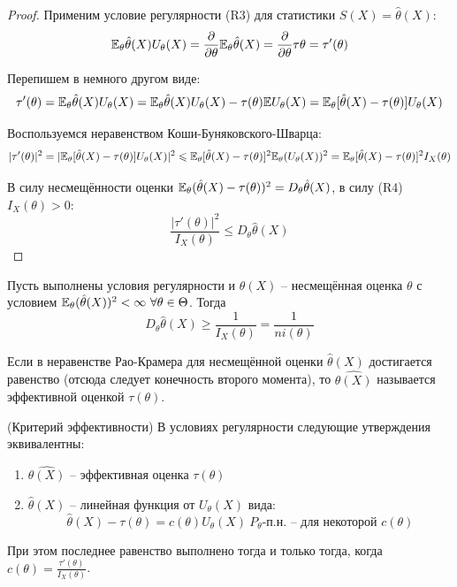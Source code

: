 \begin{proof}
    Применим условие регулярности (R3) для статистики $S(X) = \hat{\theta}(X)$:
    \[
        \mathbb{E}_\theta \hat{\theta}(X) U_\theta(X) = \frac{\partial}{\partial \theta} \mathbb{E}_\theta \hat{\theta}(X) = \frac{\partial}{\partial \theta} \tau{\theta} = \tau'(\theta)
    \]

    Перепишем в немного другом виде:
    \[
        \tau'(\theta) = \mathbb{E}_\theta \hat{\theta}(X) U_\theta(X) = \mathbb{E}_\theta \hat{\theta}(X) U_\theta(X) - \tau(\theta) \mathbb{E} U_\theta(X) = \mathbb{E}_\theta [\hat{\theta}(X) - \tau(\theta)]  U_\theta(X)
    \]

    Воспользуемся неравенством Коши-Буняковского-Шварца:
    \[
        | \tau'(\theta) |^2 = | \mathbb{E}_\theta [\hat{\theta}(X) - \tau(\theta)] U_\theta(X) |^2 \leqslant \mathbb{E}_\theta [\hat{\theta}(X) - \tau(\theta)]^2 \mathbb{E}_\theta (U_\theta(X))^2 = \mathbb{E}_\theta [\hat{\theta}(X) - \tau(\theta)]^2 I_X(\theta)
    \]

    В силу несмещённости оценки $\mathbb{E}_\theta (\hat{\theta}(X) - \tau(\theta))^2 = D_\theta \hat{\theta}(X)$, в силу (R4) $I_X(\theta) > 0$:
    \[
        \frac{|\tau'(\theta)|^2}{I_X(\theta)} \le D_\theta \hat{\theta}(X)
    \]
\end{proof}

\begin{corollary}
    Пусть выполнены условия регулярности и $\hat{\theta}(X)$ -- несмещённая оценка $\theta$ с условием $\mathbb{E}_\theta (\hat{\theta}(X))^2 < \infty \ \forall \theta \in \Theta$. Тогда
    \[
        D_\theta \hat{\theta}(X) \ge \frac{1}{I_X(\theta)} = \frac{1}{n i(\theta)}
    \]
\end{corollary}

\begin{definition}
    Если в неравенстве Рао-Крамера для несмещённой оценки $\hat{\theta}(X)$ достигается равенство (отсюда следует конечность второго момента), то $\hat{\theta(X)}$ называется эффективной оценкой $\tau(\theta)$.
\end{definition}

\begin{theorem} (Критерий эффективности)
    В условиях регулярности следующие утверждения эквивалентны:
    \begin{enumerate}
        \item $\hat{\theta(X)}$ -- эффективная оценка $\tau(\theta)$
        \item $\hat{\theta}(X)$ -- линейная функция от $U_\theta(X)$ вида:
        \[
            \hat{\theta}(X) - \tau(\theta) = c(\theta) U_\theta(X) \ P_\theta \text{-п.н.} \text{ -- для некоторой } c(\theta)
        \]
    \end{enumerate}

    При этом последнее равенство выполнено тогда и только тогда, когда $c(\theta) = \frac{\tau'(\theta)}{I_X(\theta)}$.    
\end{theorem}

